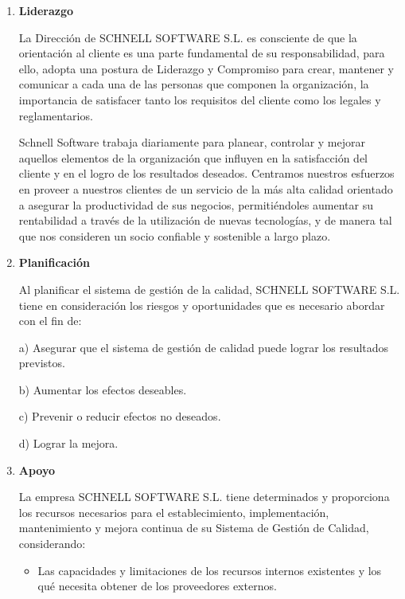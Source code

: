 \documentclass[10pt,a4paper]{article}
\begin{document}
\begin{enumerate}
\item \textbf{Liderazgo}

La Dirección de SCHNELL SOFTWARE S.L. es consciente de que la orientación al cliente es una parte fundamental de su responsabilidad, para ello, adopta una postura de Liderazgo y Compromiso para crear, mantener y comunicar a cada una de las personas que componen la organización, la importancia de satisfacer tanto los requisitos del cliente como los legales y reglamentarios.

Schnell Software trabaja diariamente para planear, controlar y mejorar aquellos elementos de la organización que influyen en la satisfacción del cliente y en el logro de los resultados deseados. Centramos nuestros esfuerzos en proveer a nuestros clientes de un servicio de la más alta calidad orientado a asegurar la productividad de sus negocios, permitiéndoles aumentar su rentabilidad a través de la utilización de nuevas tecnologías, y de manera tal que nos consideren un socio confiable y sostenible a largo plazo.

\item \textbf{Planificación}

Al planificar el sistema de gestión de la calidad, SCHNELL SOFTWARE S.L. tiene en consideración los riesgos y oportunidades que es necesario abordar con el fin de:

a) Asegurar que el sistema de gestión de calidad puede lograr los resultados previstos.

b) Aumentar los efectos deseables.

c) Prevenir o reducir efectos no deseados.

d) Lograr la mejora.

\item \textbf{Apoyo}

La empresa SCHNELL SOFTWARE S.L. tiene determinados y proporciona los recursos necesarios para el establecimiento, implementación, mantenimiento y mejora continua de su Sistema de Gestión de Calidad, considerando:

\begin{itemize}
\item Las capacidades y limitaciones de los recursos internos existentes y los qué necesita obtener de los proveedores externos.
\end{itemize}


\end{enumerate}
\end{document}
